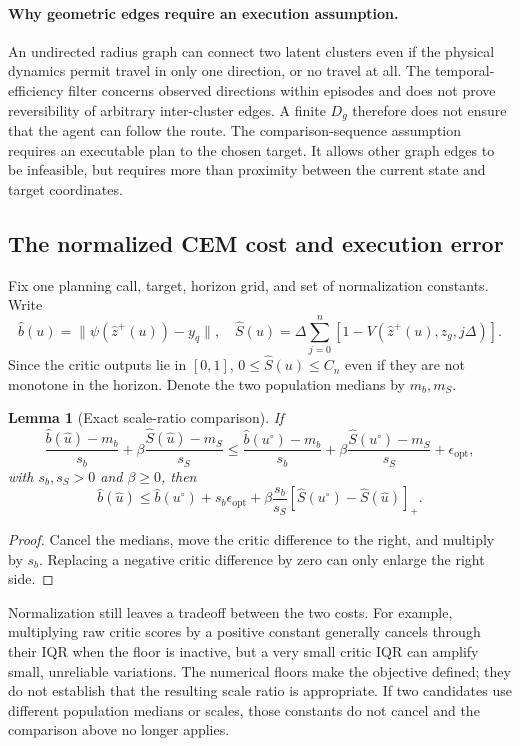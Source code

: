 \documentclass{article}
\newtheorem{lemma}[theorem]{Lemma}
\theoremstyle{definition}
\theoremstyle{remark}
\begin{document}
\paragraph{Why geometric edges require an execution assumption.}
An undirected radius graph can connect two latent clusters even if the physical
dynamics permit travel in only one direction, or no travel at all.
The temporal-efficiency filter concerns observed directions within episodes and does
not prove reversibility of arbitrary inter-cluster edges.
A finite $D_g$ therefore does not ensure that the agent can follow the route.
The comparison-sequence assumption requires an executable plan to the chosen target.
It allows other graph edges to be infeasible, but requires more than proximity between
the current state and target coordinates.

\subsection{The normalized CEM cost and execution error}
\label{app:cost-proof}
Fix one planning call, target, horizon grid, and set of normalization constants.
Write
\[
 \widehat b(u)=\|\psi(\hat z^+(u))-y_q\|,\quad
 \widehat S(u)=\Delta\sum_{j=0}^{n}[1-V(\hat z^+(u),z_g,j\Delta)].
\]
Since the critic outputs lie in $[0,1]$, $0\le\widehat S(u)\le C_n$ even if they are
not monotone in the horizon. Denote the two population medians by $m_b,m_S$.

\begin{lemma}[Exact scale-ratio comparison]
\label{lem:normalized}
If
\[
 \frac{\widehat b(\hat u)-m_b}{s_b}
 +\beta\frac{\widehat S(\hat u)-m_S}{s_S}
 \le
 \frac{\widehat b(u^\circ)-m_b}{s_b}
 +\beta\frac{\widehat S(u^\circ)-m_S}{s_S}
 +\epsilon_{\mathrm{opt}},
\]
with $s_b,s_S>0$ and $\beta\ge0$, then
\begin{equation}
 \widehat b(\hat u)\le\widehat b(u^\circ)
       +s_b\epsilon_{\mathrm{opt}}
       +\beta\frac{s_b}{s_S}
                    [\widehat S(u^\circ)-\widehat S(\hat u)]_+ .
 \label{eq:scale-comparison}
\end{equation}
\end{lemma}
\begin{proof}
Cancel the medians, move the critic difference to the right, and multiply by $s_b$.
Replacing a negative critic difference by zero can only enlarge the right side.
\end{proof}
Normalization still leaves a tradeoff between the two costs.
For example, multiplying raw critic scores by a positive constant generally cancels
through their IQR when the floor is inactive, but a very small critic IQR can amplify
small, unreliable variations. The numerical floors make the objective defined; they
do not establish that the resulting scale ratio is appropriate.
If two candidates use different population medians or scales, those constants do not
cancel and the comparison above no longer applies.
\end{document}
